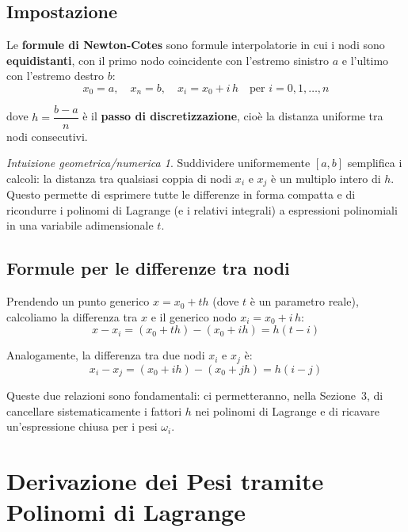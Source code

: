 \documentclass[a4paper,12pt]{article}
\theoremstyle{definition}
\theoremstyle{remark}
\newtheorem*{intuizione}{Intuizione geometrica/numerica}
\begin{document}
\subsection{Impostazione}

Le \textbf{formule di Newton-Cotes} sono formule interpolatorie in cui i
nodi sono \textbf{equidistanti}, con il primo nodo coincidente con
l'estremo sinistro $a$ e l'ultimo con l'estremo destro $b$:
\[
  x_0 = a, \quad x_n = b, \quad
  x_i = x_0 + i\,h \quad \text{per } i = 0,1,\ldots,n
\]

\noindent dove $h = \dfrac{b-a}{n}$ è il \textbf{passo di discretizzazione},
cioè la distanza uniforme tra nodi consecutivi.

\begin{intuizione}
Suddividere uniformemente $[a,b]$ semplifica i calcoli: la distanza tra
qualsiasi coppia di nodi $x_i$ e $x_j$ è un multiplo intero di $h$.
Questo permette di esprimere tutte le differenze in forma compatta e di
ricondurre i polinomi di Lagrange (e i relativi integrali) a espressioni
polinomiali in una variabile adimensionale $t$.
\end{intuizione}

\subsection{Formule per le differenze tra nodi}

Prendendo un punto generico $x = x_0 + t h$
(dove $t$ è un parametro reale), calcoliamo la differenza tra $x$ e il
generico nodo $x_i = x_0 + i\,h$:
\begin{equation}
  x - x_i = (x_0 + th) - (x_0 + ih) = h(t-i)
  \label{eq:diff-x-xi}
\end{equation}

Analogamente, la differenza tra due nodi $x_i$ e $x_j$ è:
\begin{equation}
  x_i - x_j = (x_0 + ih) - (x_0 + jh) = h(i-j)
  \label{eq:diff-xi-xj}
\end{equation}

Queste due relazioni sono fondamentali: ci permetteranno, nella Sezione~3,
di cancellare sistematicamente i fattori $h$ nei polinomi di Lagrange e di
ricavare un'espressione chiusa per i pesi $\omega_i$.

\section{Derivazione dei Pesi tramite Polinomi di Lagrange}
\end{document}
